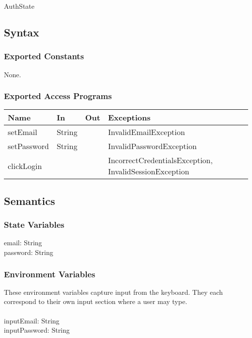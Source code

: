 \documentclass[12pt, titlepage]{article}
\begin{document}
AuthState

\subsection{Syntax}

\subsubsection{Exported Constants}
None.
\subsubsection{Exported Access Programs}

\begin{center}
\begin{tabular}{p{4cm} p{2cm} p{1cm} p{5cm}}
\hline
\textbf{Name} & \textbf{In} & \textbf{Out} & \textbf{Exceptions} \\
\hline
setEmail & String &  & InvalidEmailException \\ \hline
setPassword & String &  & InvalidPasswordException \\ \hline
clickLogin &  &  & IncorrectCredentialsException, InvalidSessionException \\
\hline
\end{tabular}
\end{center}

\subsection{Semantics}

\subsubsection{State Variables}
 email: String \\ 
password: String  \\ 

\subsubsection{Environment Variables}

These environment variables capture input from the keyboard. They each correspond to their own input section where a user may type. \\ \\
inputEmail: String \\ 
inputPassword: String  \\ 
\end{document}
